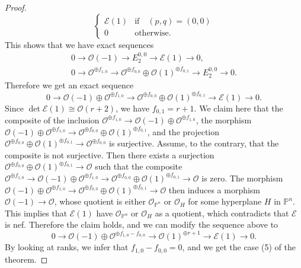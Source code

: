 \documentclass[a4paper,12pt]{amsart}
\begin{document}
\begin{proof}
\[\begin{cases}
\mathcal{E}(1)& \textrm{if}\quad  (p,q)= (0,0)\\
0&\textrm{otherwise}.
\end{cases}
\]
This shows that we have exact sequences
\begin{gather*}
0\to \mathcal{O}(-1)\to E_2^{0,0}\to \mathcal{E}(1)\to 0,\\
0\to \mathcal{O}^{\oplus f_{1,0}}\to \mathcal{O}^{\oplus f_{0,0}}\oplus \mathcal{O}(1)^{\oplus f_{0,1}}\to E_2^{0,0}\to 0.
\end{gather*}
Therefore we get an exact sequence
\[
0\to \mathcal{O}(-1)\oplus \mathcal{O}^{\oplus f_{1,0}}\to \mathcal{O}^{\oplus f_{0,0}}\oplus \mathcal{O}(1)^{\oplus f_{0,1}}
\to \mathcal{E}(1)\to 0.
\]
Since $\det\mathcal{E}(1)\cong \mathcal{O}(r+2)$, we have $f_{0,1}=r+1$.
We claim here that the composite of the inclusion $\mathcal{O}^{\oplus f_{1,0}}\to \mathcal{O}(-1)\oplus \mathcal{O}^{\oplus f_{1,0}}$,
the morphism 
$\mathcal{O}(-1)\oplus \mathcal{O}^{\oplus f_{1,0}}\to \mathcal{O}^{\oplus f_{0,0}}\oplus \mathcal{O}(1)^{\oplus f_{0,1}}$,
and the projection $\mathcal{O}^{\oplus f_{0,0}}\oplus \mathcal{O}(1)^{\oplus f_{0,1}}\to \mathcal{O}^{\oplus f_{0,0}}$ is surjective.
Assume, to the contrary, that the composite is not surjective. Then there exists a surjection $\mathcal{O}^{\oplus f_{0,0}}\oplus \mathcal{O}(1)^{\oplus f_{0,1}}
\to \mathcal{O}$ such that the composite 
$\mathcal{O}^{\oplus f_{1,0}}\to \mathcal{O}(-1)\oplus \mathcal{O}^{\oplus f_{1,0}}\to \mathcal{O}^{\oplus f_{0,0}}\oplus \mathcal{O}(1)^{\oplus f_{0,1}}
\to \mathcal{O}$ is zero. 
The morphism $\mathcal{O}(-1)\oplus \mathcal{O}^{\oplus f_{1,0}}\to \mathcal{O}^{\oplus f_{0,0}}\oplus \mathcal{O}(1)^{\oplus f_{0,1}}
\to \mathcal{O}$ then induces a morphism $\mathcal{O}(-1)\to \mathcal{O}$,
whose quotient is either $\mathcal{O}_{\mathbb{P}^n}$ or $\mathcal{O}_H$ for some hyperplane $H$ in $\mathbb{P}^n$.
This implies that $\mathcal{E}(1)$ have $\mathcal{O}_{\mathbb{P}^n}$ or $\mathcal{O}_H$ as a quotient, 
which contradicts that $\mathcal{E}$ is nef.
Therefore the claim holds, and we can modify the sequence above to
\[
0\to \mathcal{O}(-1)\oplus \mathcal{O}^{\oplus f_{1,0}-f_{0,0}}\to \mathcal{O}(1)^{\oplus r+1}
\to \mathcal{E}(1)\to 0.
\]
By looking at ranks, we infer that $f_{1,0}-f_{0,0}=0$, and we get 
the case (5) of the theorem.


\end{proof}
\end{document}
